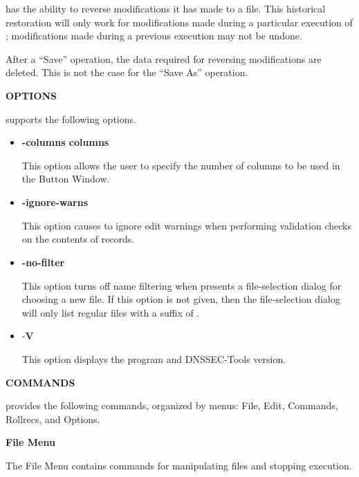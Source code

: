  has the ability to reverse modifications it has made to a
 file.  This historical restoration will only work for
modifications made during a particular execution of ;
modifications made during a previous execution may not be undone.

After a ``Save'' operation, the data required for reversing modifications are
deleted.  This is not the case for the ``Save As'' operation.

{\bf OPTIONS}

 supports the following options.

\begin{itemize}

\item {\bf -columns columns}\verb" "

This option allows the user to specify the number of columns to be used in
the Button Window.

\item {\bf -ignore-warns}\verb" "

This option causes  to ignore edit warnings when performing
validation checks on the contents of  records.

\item {\bf -no-filter}\verb" "

This option turns off name filtering when  presents a
file-selection dialog for choosing a new  file.  If this option
is not given, then the file-selection dialog will only list regular files
with a suffix of .

\item -{\bf V}\verb" "

This option displays the program and DNSSEC-Tools version.

\end{itemize}

{\bf COMMANDS}

 provides the following commands, organized by menus:
File, Edit, Commands, Rollrecs, and Options.

{\bf File Menu}

The File Menu contains commands for manipulating  files and
stopping execution.

